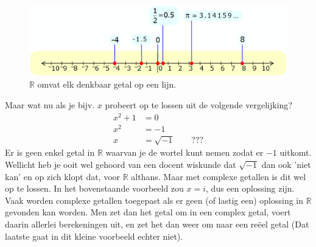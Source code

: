 \begin{figure}[h!]
    \centering
    \includegraphics[scale=0.35]{pictures/figuren/line.png}
    \caption{$\mathbb{R}$ omvat elk denkbaar getal op een lijn.}
    \label{fig:lijnreeel}
\end{figure}

Maar wat nu als je bijv. $x$ probeert op te lossen uit de volgende vergelijking?
\begin{align*}
    x^2 + 1 &= 0 \\
    x^2 &= -1 \\
    x &= \sqrt{-1} \qquad ???
\end{align*}
Er is geen enkel getal in $\mathbb{R}$ waarvan je de wortel kunt nemen zodat er $-1$ uitkomt. Wellicht heb je ooit wel gehoord van een docent wiskunde dat $\sqrt{-1}$ dan ook 'niet kan' en op zich klopt dat, voor $\mathbb{R}$ althans. Maar met complexe getallen is dit wel op te lossen. 
In het bovenstaande voorbeeld zou $x=i$, dus een oplossing zijn. Vaak worden complexe getallen toegepast als er geen (of lastig een) oplossing in $\mathbb{R}$ gevonden kan worden. Men zet dan het getal om in een complex getal, voert daarin allerlei berekeningen uit, en zet het dan weer om naar een reëel getal (Dat laatste gaat in dit kleine voorbeeld echter niet). \\


